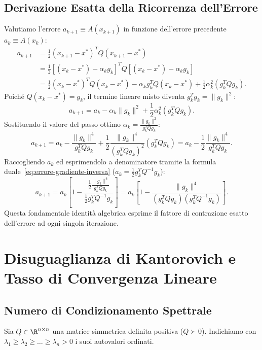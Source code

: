 \subsection{Derivazione Esatta della Ricorrenza dell'Errore}
Valutiamo l'errore $a_{k+1} \equiv A(x_{k+1})$ in funzione dell'errore precedente $a_k \equiv A(x_k)$:
\begin{align}
    a_{k+1} &= \frac{1}{2} (x_{k+1} - x^*)^T Q (x_{k+1} - x^*) \nonumber \\
            &= \frac{1}{2} [(x_k - x^*) - \alpha_k g_k]^T Q [(x_k - x^*) - \alpha_k g_k] \nonumber \\
            &= \frac{1}{2} (x_k - x^*)^T Q (x_k - x^*) - \alpha_k g_k^T Q (x_k - x^*) + \frac{1}{2} \alpha_k^2 (g_k^T Q g_k).
\end{align}
Poich\'e $Q(x_k - x^*) = g_k$, il termine lineare misto diventa $g_k^T g_k = \|g_k\|^2$:
\begin{equation}
    a_{k+1} = a_k - \alpha_k \|g_k\|^2 + \frac{1}{2} \alpha_k^2 (g_k^T Q g_k).
\end{equation}
Sostituendo il valore del passo ottimo $\alpha_k = \frac{\|g_k\|^2}{g_k^T Q g_k}$:
\begin{equation}
    a_{k+1} = a_k - \frac{\|g_k\|^4}{g_k^T Q g_k} + \frac{1}{2} \frac{\|g_k\|^4}{(g_k^T Q g_k)^2} (g_k^T Q g_k) = a_k - \frac{1}{2} \frac{\|g_k\|^4}{g_k^T Q g_k}.
\end{equation}
Raccogliendo $a_k$ ed esprimendolo a denominatore tramite la formula duale~\eqref{eq:errore-gradiente-inversa} ($a_k = \frac{1}{2} g_k^T Q^{-1} g_k$):
\begin{equation}
    a_{k+1} = a_k \left[ 1 - \frac{\frac{1}{2} \frac{\|g_k\|^4}{g_k^T Q g_k}}{\frac{1}{2} g_k^T Q^{-1} g_k} \right] = a_k \left[ 1 - \frac{\|g_k\|^4}{(g_k^T Q g_k)(g_k^T Q^{-1} g_k)} \right].
    \label{eq:ricorrenza-esatta-errore}
\end{equation}
Questa fondamentale identit\`a algebrica esprime il fattore di contrazione esatto dell'errore ad ogni singola iterazione.

\FloatBarrier
\section{Disuguaglianza di Kantorovich e Tasso di Convergenza Lineare}
\label{sec:kantorovich-tasso-lineare}

\subsection{Numero di Condizionamento Spettrale}
Sia $Q \in \R^{n \times n}$ una matrice simmetrica definita positiva ($Q \succ 0$). Indichiamo con $\lambda_1 \ge \lambda_2 \ge \dots \ge \lambda_n > 0$ i suoi autovalori ordinati.

